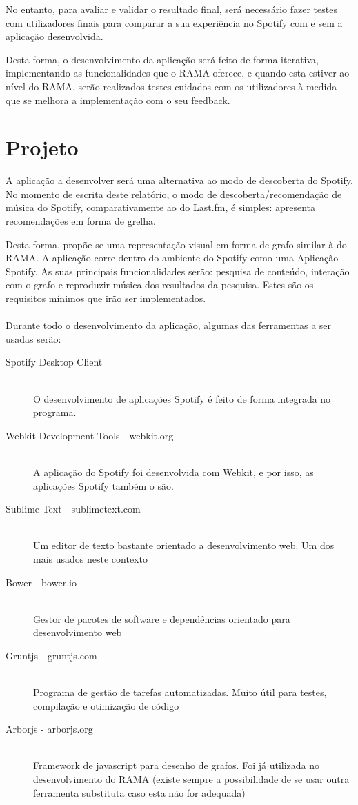No entanto, para avaliar e validar o resultado final, será necessário fazer testes com utilizadores finais para comparar a sua experiência no Spotify com e sem a aplicação desenvolvida.

Desta forma, o desenvolvimento da aplicação será feito de forma iterativa, implementando as funcionalidades que o RAMA oferece, e quando esta estiver ao nível do RAMA, serão realizados testes cuidados com os utilizadores à medida que se melhora a implementação com o seu feedback.

\section{Projeto} \label{sec:proj}

A aplicação a desenvolver será uma alternativa ao modo de descoberta do Spotify.
No momento de escrita deste relatório, o modo de descoberta/recomendação de música do Spotify, comparativamente ao do Last.fm, é simples: apresenta recomendações em forma de grelha.

Desta forma, propõe-se uma representação visual em forma de grafo similar à do RAMA.
A aplicação corre dentro do ambiente do Spotify como uma Aplicação Spotify.
As suas principais funcionalidades serão: pesquisa de conteúdo, interação com o grafo e reproduzir música dos resultados da pesquisa.
Estes são os requisitos mínimos que irão ser implementados.
\\
\\
Durante todo o desenvolvimento da aplicação, algumas das ferramentas a ser usadas serão:

\begin{description}
  \item[Spotify Desktop Client] \hfill \\
    O desenvolvimento de aplicações Spotify é feito de forma integrada no programa.
  \item[Webkit Development Tools - webkit.org] \hfill \\
    A aplicação do Spotify foi desenvolvida com Webkit, e por isso, as aplicações Spotify também o são.
  \item[Sublime Text - sublimetext.com] \hfill \\
    Um editor de texto bastante orientado a desenvolvimento web. Um dos mais usados neste contexto
  \item[Bower - bower.io] \hfill \\
    Gestor de pacotes de software e dependências orientado para desenvolvimento web
  \item[Gruntjs - gruntjs.com] \hfill \\
    Programa de gestão de tarefas automatizadas. Muito útil para testes, compilação e otimização de código
  \item[Arborjs - arborjs.org] \hfill \\
    Framework de javascript para desenho de grafos. Foi já utilizada no desenvolvimento do RAMA (existe sempre a possibilidade de se usar outra ferramenta substituta caso esta não for adequada)
\end{description}



